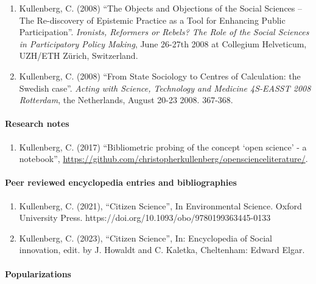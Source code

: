 \documentclass[
]{article}
\providecommand{\tightlist}{%
  \setlength{\itemsep}{0pt}\setlength{\parskip}{0pt}}
\begin{document}
\begin{enumerate}
{  First International Deleuze Studies Conference}, 1 Monday: 11/08/08.
\item
  Kullenberg, C. (2008) ``The Objects and Objections of the Social
  Sciences -- The Re-discovery of Epistemic Practice as a Tool for
  Enhancing Public Participation''. \emph{Ironists, Reformers or Rebels?
  The Role of the Social Sciences in Participatory Policy Making}, June
  26-27th 2008 at Collegium Helveticum, UZH/ETH Zürich, Switzerland.
\item
  Kullenberg, C. (2008) ``From State Sociology to Centres of
  Calculation: the Swedish case''. \emph{Acting with Science, Technology
  and Medicine 4S-EASST 2008 Rotterdam}, the Netherlands, August 20-23
  2008. 367-368.
\end{enumerate}

\hypertarget{research-notes}{%
\paragraph{Research notes}\label{research-notes}}

\begin{enumerate}
\def\labelenumi{\arabic{enumi}.}
\tightlist
\item
  Kullenberg, C. (2017) ``Bibliometric probing of the concept `open
  science' - a notebook'',
  \url{https://github.com/christopherkullenberg/openscienceliterature/}.
\end{enumerate}

\hypertarget{peer-reviewed-encyclopedia-entries-and-bibliographies}{%
\paragraph{Peer reviewed encyclopedia entries and
bibliographies}\label{peer-reviewed-encyclopedia-entries-and-bibliographies}}

\begin{enumerate}
\def\labelenumi{\arabic{enumi}.}
\tightlist
\item
  Kullenberg, C. (2021), ``Citizen Science'', In Environmental Science.
  Oxford University Press.
  https://doi.org/10.1093/obo/9780199363445-0133
\item
  Kullenberg, C. (2023), ``Citizen Science'', In: Encyclopedia of Social
  innovation, edit. by J. Howaldt and C. Kaletka, Cheltenham: Edward
  Elgar.
\end{enumerate}

\hypertarget{popularizations}{%
\paragraph{Popularizations}\label{popularizations}}
\end{document}
